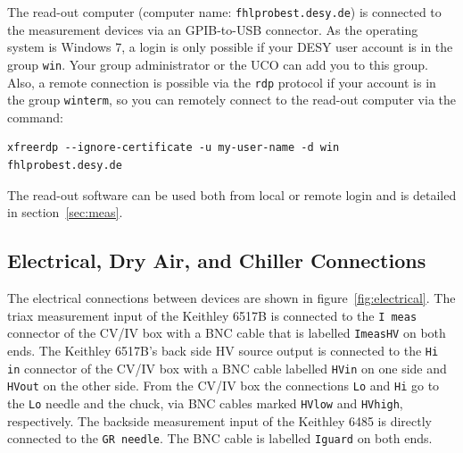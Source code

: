 \documentclass[a4paper]{article}
\begin{document}
The read-out computer (computer name: {\tt fhlprobest.desy.de}) is connected to the measurement devices via an GPIB-to-USB connector.
As the operating system is Windows 7, a login is only possible if your DESY user account is in the group {\tt win}.
Your group administrator or the UCO can add you to this group.
Also, a remote connection is possible via the {\tt rdp} protocol if your account is in the group {\tt winterm}, so you can remotely connect to the read-out computer via the command:

\begin{lstlisting}
xfreerdp --ignore-certificate -u my-user-name -d win fhlprobest.desy.de
\end{lstlisting}

The read-out software can be used both from local or remote login and is detailed in section~\ref{sec:meas}.\\

\subsection{Electrical, Dry Air, and Chiller Connections}
\label{sec:connections}

The electrical connections between devices are shown in figure~\ref{fig:electrical}.
The triax measurement input of the Keithley 6517B is connected to the {\tt I meas} connector of the CV/IV box with a BNC cable that is labelled {\tt ImeasHV} on both ends.
The Keithley 6517B's back side HV source output is connected to the {\tt Hi in} connector of the CV/IV box with a BNC cable labelled {\tt HVin} on one side and {\tt HVout} on the other side.
From the CV/IV box the connections {\tt Lo} and {\tt Hi} go to the {\tt Lo} needle and the chuck, via BNC cables marked {\tt HVlow} and {\tt HVhigh}, respectively.
The backside measurement input of the Keithley 6485 is directly connected to the {\tt GR needle}.
The BNC cable is labelled {\tt Iguard} on both ends.\\
\end{document}
